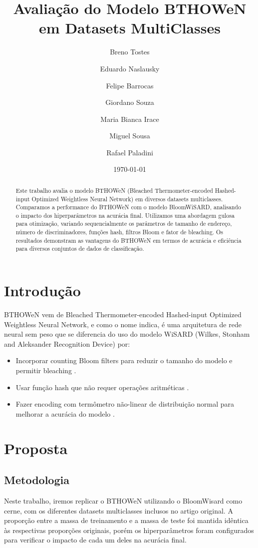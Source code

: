 \documentclass{article}
\title{Avaliação do Modelo BTHOWeN em Datasets MultiClasses}
\author{Breno Tostes \and Eduardo Naslausky \and Felipe Barrocas \and Giordano Souza \and Maria Bianca Irace \and Miguel Sousa \and Rafael Paladini}
\date{\today}
\begin{document}
\maketitle

\begin{abstract}
Este trabalho avalia o modelo BTHOWeN (Bleached Thermometer-encoded Hashed-input Optimized Weightless Neural Network) em diversos datasets multiclasses. Comparamos a performance do BTHOWeN com o modelo BloomWiSARD, analisando o impacto dos hiperparâmetros na acurácia final. Utilizamos uma abordagem gulosa para otimização, variando sequencialmente os parâmetros de tamanho de endereço, número de discriminadores, funções hash, filtros Bloom e fator de bleaching. Os resultados demonstram as vantagens do BTHOWeN em termos de acurácia e eficiência para diversos conjuntos de dados de classificação.
\end{abstract}

\section{Introdução}

BTHOWeN vem de Bleached Thermometer-encoded Hashed-input Optimized Weightless Neural Network, e como o nome indica, é uma arquitetura de rede neural sem peso que se diferencia do uso do modelo WiSARD (Wilkes, Stonham and Aleksander Recognition Device) \cite{lima2020wisardpkg} por:

\begin{itemize}
    \item Incorporar counting Bloom filters para reduzir o tamanho do modelo e permitir bleaching \cite{santiago2020}.
    \item Usar função hash que não requer operações aritméticas \cite{susskind2022}.
    \item Fazer encoding com termômetro não-linear de distribuição normal para melhorar a acurácia do modelo \cite{susskind2022, santiago2020}.
\end{itemize}

\section{Proposta}
\subsection{Metodologia}

Neste trabalho, iremos replicar o BTHOWeN utilizando o BloomWisard como cerne, com os diferentes datasets multiclasses inclusos no artigo original. A proporção entre a massa de treinamento e a massa de teste foi mantida idêntica às respectivas proporções originais, porém os hiperparâmetros foram configurados para verificar o impacto de cada um deles na acurácia final.
\end{document}
